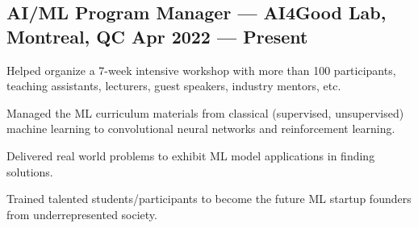 \documentclass[letter,11pt]{article}
\begin{document}
\subsection{AI/ML Program Manager --- AI4Good Lab, Montreal, QC \hfill Apr 2022 --- Present}
\begin{zitemize}
	\item Helped organize a 7-week intensive workshop with more than 100 participants, teaching assistants, lecturers, guest speakers, industry mentors, etc.
	\item Managed the ML curriculum materials from classical (supervised, unsupervised) machine learning to convolutional neural networks and reinforcement learning.
	\item Delivered real world problems to exhibit ML model applications in finding solutions.
	\item Trained talented students/participants to become the future ML startup founders from underrepresented society.
\end{zitemize}
\end{document}
